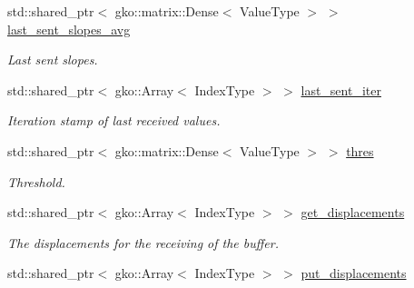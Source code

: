 \begin{DoxyCompactItemize}
std\+::shared\+\_\+ptr$<$ gko\+::matrix\+::\+Dense$<$ Value\+Type $>$ $>$ \hyperlink{structschwz_1_1Communicate_1_1comm__struct_a06f2c470810bc90065caee045ac8d5a0}{last\+\_\+sent\+\_\+slopes\+\_\+avg}
\begin{DoxyCompactList}\small\item\em Last sent slopes. \end{DoxyCompactList}\item 
\mbox{\label{structschwz_1_1Communicate_1_1comm__struct_a1c01e46ae44660795dd205c647ff980c}} 
std\+::shared\+\_\+ptr$<$ gko\+::\+Array$<$ Index\+Type $>$ $>$ \hyperlink{structschwz_1_1Communicate_1_1comm__struct_a1c01e46ae44660795dd205c647ff980c}{last\+\_\+sent\+\_\+iter}
\begin{DoxyCompactList}\small\item\em Iteration stamp of last received values. \end{DoxyCompactList}\item 
\mbox{\label{structschwz_1_1Communicate_1_1comm__struct_a662f0688ae944724166cc09c83437c94}} 
std\+::shared\+\_\+ptr$<$ gko\+::matrix\+::\+Dense$<$ Value\+Type $>$ $>$ \hyperlink{structschwz_1_1Communicate_1_1comm__struct_a662f0688ae944724166cc09c83437c94}{thres}
\begin{DoxyCompactList}\small\item\em Threshold. \end{DoxyCompactList}\item 
\mbox{\label{structschwz_1_1Communicate_1_1comm__struct_aa9d510fb291e896fa14fe3e0f00f0454}} 
std\+::shared\+\_\+ptr$<$ gko\+::\+Array$<$ Index\+Type $>$ $>$ \hyperlink{structschwz_1_1Communicate_1_1comm__struct_aa9d510fb291e896fa14fe3e0f00f0454}{get\+\_\+displacements}
\begin{DoxyCompactList}\small\item\em The displacements for the receiving of the buffer. \end{DoxyCompactList}\item 
\mbox{\label{structschwz_1_1Communicate_1_1comm__struct_abb06062ad6fddb9d0399625f4d799d08}} 
std\+::shared\+\_\+ptr$<$ gko\+::\+Array$<$ Index\+Type $>$ $>$ \hyperlink{structschwz_1_1Communicate_1_1comm__struct_abb06062ad6fddb9d0399625f4d799d08}{put\+\_\+displacements}

\end{DoxyCompactItemize}
